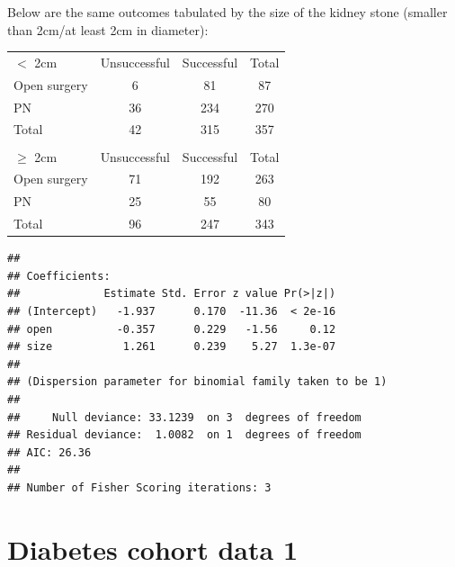 \documentclass[10pt,handout]{beamer}\usepackage[]{graphicx}\usepackage[]{color}
\makeatletter
\newenvironment{kframe}{%
 \def\at@end@of@kframe{}%
 \ifinner\ifhmode%
  \def\at@end@of@kframe{\end{minipage}}%
  \begin{minipage}{\columnwidth}%
 \fi\fi%
 \def\FrameCommand##1{\hskip\@totalleftmargin \hskip-\fboxsep
 \colorbox{shadecolor}{##1}\hskip-\fboxsep
     \hskip-\linewidth \hskip-\@totalleftmargin \hskip\columnwidth}%
 \MakeFramed {\advance\hsize-\width
   \@totalleftmargin\z@ \linewidth\hsize
   \@setminipage}}%
 {\par\unskip\endMakeFramed%
 \at@end@of@kframe}
\newenvironment{knitrout}{}{} %
\makeatother
\begin{document}
\begin{frame}
\vspace{-.91in}
\tiny
Below are the same outcomes tabulated by the size of the kidney stone (smaller than 2cm/at least 2cm in diameter):

\begin{table}[h]
	\centering
	\begin{tabular}{lcc|c}
		$<$ 2cm & Unsuccessful &  Successful & Total\\
		Open surgery & 6 & 81 & 87 \\
		PN 			 & 36 & 234 & 270 \\
		\hline
		Total 	& 42 & 315 & 357 \\
		& & &  \\
		$\geq$ 2cm & Unsuccessful &  Successful & Total\\
		Open surgery & 71 & 192 & 263 \\
		PN 			 & 25 & 55 & 80 \\
		\hline
		Total 		& 96 & 247 & 343
	\end{tabular}
\end{table}

\vspace{-.21in}
\begin{knitrout}\tiny
{}\color{fgcolor}\begin{kframe}
\begin{verbatim}
## 
## Coefficients:
##             Estimate Std. Error z value Pr(>|z|)
## (Intercept)   -1.937      0.170  -11.36  < 2e-16
## open          -0.357      0.229   -1.56     0.12
## size           1.261      0.239    5.27  1.3e-07
## 
## (Dispersion parameter for binomial family taken to be 1)
## 
##     Null deviance: 33.1239  on 3  degrees of freedom
## Residual deviance:  1.0082  on 1  degrees of freedom
## AIC: 26.36
## 
## Number of Fisher Scoring iterations: 3
\end{verbatim}
\end{kframe}
\end{knitrout}
\end{frame}



\section{Diabetes cohort data 1}
\end{document}
